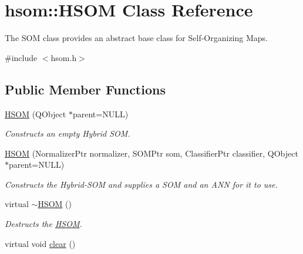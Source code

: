 \hypertarget{classhsom_1_1_h_s_o_m}{\section{hsom\-:\-:\-H\-S\-O\-M \-Class \-Reference}
\label{classhsom_1_1_h_s_o_m}
}


\-The \-S\-O\-M class provides an abstract base class for \-Self-\/\-Organizing \-Maps.  




{\ttfamily \#include $<$hsom.\-h$>$}

\subsection*{\-Public \-Member \-Functions}
\begin{DoxyCompactItemize}
\item 
\hyperlink{classhsom_1_1_h_s_o_m_af03125b52782ed511021562aa9e44acf}{\-H\-S\-O\-M} (\-Q\-Object $\ast$parent=\-N\-U\-L\-L)
\begin{DoxyCompactList}\small\item\em \-Constructs an empty \-Hybrid \-S\-O\-M. \end{DoxyCompactList}\item 
\hyperlink{classhsom_1_1_h_s_o_m_a96b649d5e6d6531a07e699c2ea807abb}{\-H\-S\-O\-M} (\-Normalizer\-Ptr normalizer, \-S\-O\-M\-Ptr som, \-Classifier\-Ptr classifier, \-Q\-Object $\ast$parent=\-N\-U\-L\-L)
\begin{DoxyCompactList}\small\item\em \-Constructs the \-Hybrid-\/\-S\-O\-M and supplies a \-S\-O\-M and an \-A\-N\-N for it to use. \end{DoxyCompactList}\item 
\hypertarget{classhsom_1_1_h_s_o_m_a58038ba3d4bd255ec0dd15604d9a2a3e}{virtual \hyperlink{classhsom_1_1_h_s_o_m_a58038ba3d4bd255ec0dd15604d9a2a3e}{$\sim$\-H\-S\-O\-M} ()}\label{classhsom_1_1_h_s_o_m_a58038ba3d4bd255ec0dd15604d9a2a3e}

\begin{DoxyCompactList}\small\item\em \-Destructs the \hyperlink{classhsom_1_1_h_s_o_m}{\-H\-S\-O\-M}. \end{DoxyCompactList}\item 
\hypertarget{classhsom_1_1_h_s_o_m_a4a7d4cd2e51394425dcce16667832130}{virtual void \hyperlink{classhsom_1_1_h_s_o_m_a4a7d4cd2e51394425dcce16667832130}{clear} ()}\label{classhsom_1_1_h_s_o_m_a4a7d4cd2e51394425dcce16667832130}


\end{DoxyCompactItemize}
